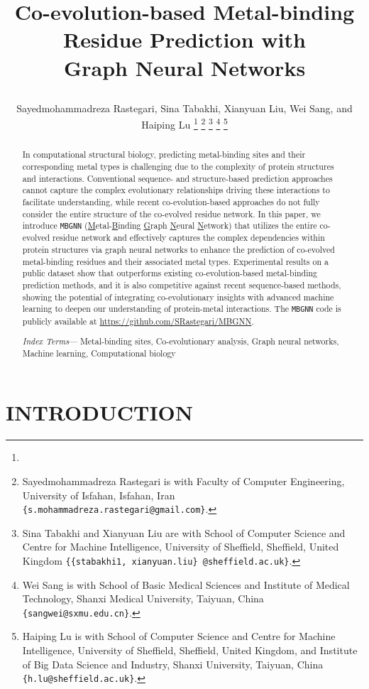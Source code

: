 \documentclass[letterpaper, 10 pt, conference]{ieeeconf}
\title{\LARGE \bf
Co-evolution-based Metal-binding Residue Prediction with \\Graph Neural Networks

}
\author{Sayedmohammadreza Rastegari, Sina Tabakhi, Xianyuan Liu, Wei Sang, and Haiping Lu%
\thanks{}%
\thanks{Sayedmohammadreza Rastegari is with Faculty of Computer Engineering,
        University of Isfahan, Isfahan, Iran
        {\tt\small \{s.mohammadreza.rastegari@gmail.com\}}.}%
\thanks{Sina Tabakhi and Xianyuan Liu are with School of Computer Science and Centre for Machine Intelligence, University of Sheffield, Sheffield, United Kingdom
        {\tt\small \{\{stabakhi1, xianyuan.liu\} @sheffield.ac.uk\}}.}%
\thanks{Wei Sang is with School of Basic Medical Sciences and Institute of Medical Technology, Shanxi Medical University, Taiyuan, China
    {\tt\small \{sangwei@sxmu.edu.cn\}}.}%
\thanks{Haiping Lu is with School of Computer Science and Centre for Machine Intelligence, University of Sheffield, Sheffield, United Kingdom, and Institute of Big Data Science and Industry, Shanxi University, Taiyuan, China
        {\tt\small \{h.lu@sheffield.ac.uk\}}.}%
}
\begin{document}
\maketitle
\thispagestyle{empty}
\pagestyle{empty}





\begin{abstract}

In computational structural biology, predicting metal-binding sites and their corresponding metal types is challenging due to the complexity of protein structures and interactions. Conventional sequence- and structure-based prediction approaches cannot capture the complex evolutionary relationships driving these interactions to facilitate understanding, while recent co-evolution-based approaches do not fully consider the entire structure of the co-evolved residue network. In this paper, we introduce {\normalfont\texttt{MBGNN}} (\underline{M}etal-\underline{B}inding \underline{G}raph \underline{N}eural \underline{N}etwork) that utilizes the entire co-evolved residue network and effectively captures the complex dependencies within protein structures via graph neural networks to enhance the prediction of co-evolved metal-binding residues and their associated metal types. Experimental results on a public dataset show that {} outperforms existing co-evolution-based metal-binding prediction methods, and it is also competitive against recent sequence-based methods, showing the potential of integrating co-evolutionary insights with advanced machine learning to deepen our understanding of protein-metal interactions. The {\normalfont\texttt{MBGNN}} code is publicly available at \href{https://github.com/SRastegari/MBGNN}{https://github.com/SRastegari/MBGNN}.
\newline

\indent \textit{Index Terms}— Metal-binding sites, Co-evolutionary analysis, Graph neural networks, Machine learning, Computational biology
\end{abstract}



\section{INTRODUCTION}
\end{document}
